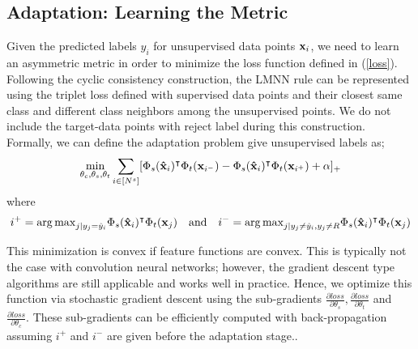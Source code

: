 \subsection{Adaptation: Learning the Metric}
\label{metric}
Given the predicted labels $y_i$ for unsupervised data points $\mathbf{x}_i$, we need to learn an asymmetric metric in order to minimize the loss function defined in (\ref{loss}). Following the cyclic consistency construction, the LMNN rule can be represented using the triplet loss defined with supervised data points and their closest same class and different class neighbors among the unsupervised points. We do not include the target-data points with reject label during this construction. Formally, we can define the adaptation problem give unsupervised labels as;
\begin{equation}
\begin{aligned}
\min_{\theta_c,\theta_s,\theta_t} &\sum_{i \in [N^s]} [\Phi_s(\mathbf{\hat{x}}_i)^\intercal \Phi_t(\mathbf{x}_{i^-}) -\Phi_s(\mathbf{\hat{x}}_i)^\intercal \Phi_t(\mathbf{x}_{i^+}) + \alpha]_{+} \\
\end{aligned}
\end{equation}
where 
\begin{equation}
i^{+} = {\arg\max}_{j | y_j = \hat{y}_i} \Phi_s(\mathbf{\hat{x}}_i)^\intercal \Phi_t(\mathbf{x}_j) \quad  \text{and} \quad   i^{-} = {\arg\max}_{j | y_j \neq \hat{y}_i, y_j \neq R}  \Phi_s(\mathbf{\hat{x}}_i)^\intercal \Phi_t(\mathbf{x}_j)
\label{sup_nn}
\end{equation}

This minimization is convex if feature functions are convex. This is typically not the case with convolution neural networks; however, the gradient descent type algorithms are still applicable and works well in practice. Hence, we optimize this function via stochastic gradient descent using the sub-gradients $\frac{\partial loss}{\partial \theta_s}, \frac{\partial loss}{\partial \theta_t}$ and $\frac{\partial loss}{\partial \theta_c}$. These sub-gradients can be efficiently computed with back-propagation assuming $i^{+}$ and $i^{-}$ are given before the adaptation stage..
  